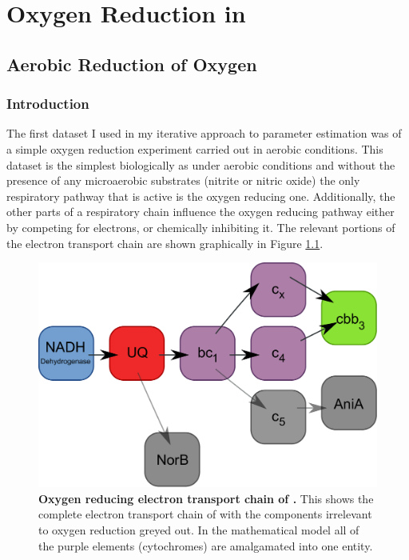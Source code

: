 \chapter{Oxygen Reduction in \Nm{}}
\label{chap:oxygenreduction}
\section{Aerobic Reduction of Oxygen}
\subsection{Introduction}
The first dataset I used in my iterative approach to parameter estimation was of a simple oxygen reduction experiment carried out in aerobic conditions. This dataset is the simplest biologically as under aerobic conditions and without the presence of any microaerobic substrates (nitrite or nitric oxide) the only respiratory pathway that is active is the oxygen reducing one. Additionally, the other parts of a respiratory chain influence the oxygen reducing pathway either by competing for electrons, or chemically inhibiting it. The relevant portions of the electron transport chain are shown graphically in Figure \ref{fig:o2_resp_chain}.

\begin{figure}[tbp]
	\centering
	\includegraphics[width=14cm]{05-oxygenreduction/data/o2_resp_chain.pdf}
	\caption[Oxygen reducing electron transport chain of \Nm{}]{{\bf Oxygen reducing electron transport chain of \Nm{}.} This shows the complete electron transport chain of \Nsm{} with the components irrelevant to oxygen reduction greyed out. In the mathematical model all of the purple elements (cytochromes) are amalgamated into one entity.
	\label{fig:o2_resp_chain}}
\end{figure}

